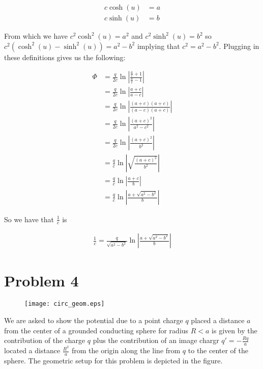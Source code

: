 \documentclass[paper=a4, fontsize=11pt]{scrartcl} %
\numberwithin{equation}{section} %
\numberwithin{figure}{section} %
\numberwithin{table}{section} %
\begin{document}
\begin{align}
c\cosh(u) &= a \\
c\sinh(u) &= b
\end{align}

From which we have $c^2 \cosh^2(u) = a^2$ and $c^2\sinh^2(u) = b^2$ so $c^2(\cosh^2(u) - \sinh^2(u)) = a^2 - b^2$ implying that $c^2 = a^2 - b^2$. Plugging in these definitions gives us the following:

\begin{align}
\Phi &= \frac{q}{2c}\ln\left|\frac{\frac{a}{c} + 1}{\frac{a}{c} - 1}\right| \\
&= \frac{q}{2c}\ln\left|\frac{a + c}{a - c}\right| \\
&= \frac{q}{2c}\ln\left|\frac{(a + c)(a + c)}{(a - c)(a + c)}\right| \\
&= \frac{q}{2c}\ln\left|\frac{(a+c)^2}{a^2 - c^2}\right| \\
&= \frac{q}{2c}\ln\left|\frac{(a+c)^2}{b^2}\right| \\
&= \frac{q}{c}\ln\left|\sqrt{\frac{(a + c)^2}{b^2}}\right| \\
&= \frac{q}{c}\ln\left|\frac{a + c}{b}\right| \\
&= \frac{q}{c}\ln\left|\frac{a + \sqrt{a^2 - b^2}}{b}\right|
\end{align}

So we have that $\frac{1}{c}$ is 

\begin{align}
\frac{1}{c} = \frac{q}{\sqrt{a^2 - b^2}}\ln\left|\frac{a + \sqrt{a^2 - b^2}}{b}\right|
\end{align}


\section{Problem 4}

\begin{figure}[H]
\begin{center}
\texttt{[image: circ\_geom.eps]}
\end{center}
\end{figure}

We are asked to show the potential due to a point charge $q$ placed a distance $a$ from the center of a grounded conducting sphere for radius $R < a$ is given by the contribution of the charge $q$ plus the contribution of an image chargr $q' =  -\frac{R q}{a}$ located a distance $\frac{R^2}{a}$ from the origin along the line from $q$ to the center of the sphere. The geometric setup for this problem is depicted in the figure. 
 
\end{document}
